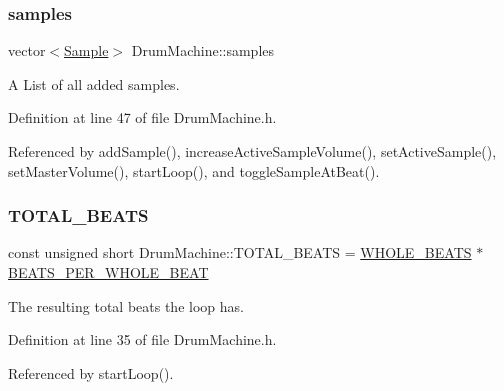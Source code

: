 \mbox{\label{class_drum_machine_acf215ead70c41e760556497281aa562e}} 
\subsubsection{\texorpdfstring{samples}{samples}}
{\footnotesize\ttfamily vector$<$\hyperlink{class_sample}{Sample}$>$ Drum\+Machine\+::samples\hspace{0.3cm}{\ttfamily [private]}}



A List of all added samples. 



Definition at line 47 of file Drum\+Machine.\+h.



Referenced by add\+Sample(), increase\+Active\+Sample\+Volume(), set\+Active\+Sample(), set\+Master\+Volume(), start\+Loop(), and toggle\+Sample\+At\+Beat().

\mbox{\label{class_drum_machine_a25ff7c6556614ab787a626a5c6ec1683}} 
\subsubsection{\texorpdfstring{T\+O\+T\+A\+L\+\_\+\+B\+E\+A\+TS}{TOTAL\_BEATS}}
{\footnotesize\ttfamily const unsigned short Drum\+Machine\+::\+T\+O\+T\+A\+L\+\_\+\+B\+E\+A\+TS = \hyperlink{class_drum_machine_a54e06658e13970dc7679051e8194f546}{W\+H\+O\+L\+E\+\_\+\+B\+E\+A\+TS} $\ast$ \hyperlink{class_drum_machine_ab4d2056f29b6eb959aa379afcc6b70f0}{B\+E\+A\+T\+S\+\_\+\+P\+E\+R\+\_\+\+W\+H\+O\+L\+E\+\_\+\+B\+E\+AT}\hspace{0.3cm}{\ttfamily [private]}}



The resulting total beats the loop has. 



Definition at line 35 of file Drum\+Machine.\+h.



Referenced by start\+Loop().

\mbox{\label{class_drum_machine_af1401c2a8e1d016ec32c662968e581fd}} 
